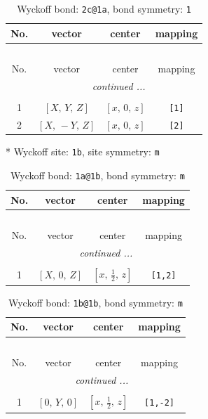 \documentclass[fleqn,8pt]{jsarticle}
\begin{document}
\renewcommand{\arraystretch}{1.2}
\begin{longtable}{cccc}
\caption{Wyckoff bond: {\tt 2c@1a}, bond symmetry: {\tt 1}}
 \\
 \hline \hline
No. & vector & center & mapping \\ \hline \endfirsthead

\multicolumn{3}{l}{\tablename\ \thetable{}} \\
 \hline \hline
No. & vector & center & mapping \\ \hline \endhead

 \hline \hline
\multicolumn{3}{r}{\footnotesize\it continued ...} \\ \endfoot

 \hline \hline
\multicolumn{3}{r}{} \\ \endlastfoot

1 & $\left[ X,\, Y,\, Z \right]$ & $\left[ x,\, 0,\, z \right]$ & {\tt [1]} \\ \hline
2 & $\left[ X,\, - Y,\, Z \right]$ & $\left[ x,\, 0,\, z \right]$ & {\tt [2]} \\
\end{longtable}
* Wyckoff site: {\tt 1b}, site symmetry: {\tt m}
\renewcommand{\arraystretch}{1.2}
\begin{longtable}{cccc}
\caption{Wyckoff bond: {\tt 1a@1b}, bond symmetry: {\tt m}}
 \\
 \hline \hline
No. & vector & center & mapping \\ \hline \endfirsthead

\multicolumn{3}{l}{\tablename\ \thetable{}} \\
 \hline \hline
No. & vector & center & mapping \\ \hline \endhead

 \hline \hline
\multicolumn{3}{r}{\footnotesize\it continued ...} \\ \endfoot

 \hline \hline
\multicolumn{3}{r}{} \\ \endlastfoot

1 & $\left[ X,\, 0,\, Z \right]$ & $\left[ x,\, \frac{1}{2},\, z \right]$ & {\tt [1,2]} \\
\end{longtable}
\renewcommand{\arraystretch}{1.2}
\begin{longtable}{cccc}
\caption{Wyckoff bond: {\tt 1b@1b}, bond symmetry: {\tt m}}
 \\
 \hline \hline
No. & vector & center & mapping \\ \hline \endfirsthead

\multicolumn{3}{l}{\tablename\ \thetable{}} \\
 \hline \hline
No. & vector & center & mapping \\ \hline \endhead

 \hline \hline
\multicolumn{3}{r}{\footnotesize\it continued ...} \\ \endfoot

 \hline \hline
\multicolumn{3}{r}{} \\ \endlastfoot

1 & $\left[ 0,\, Y,\, 0 \right]$ & $\left[ x,\, \frac{1}{2},\, z \right]$ & {\tt [1,-2]} \\
\end{longtable}
\end{document}
